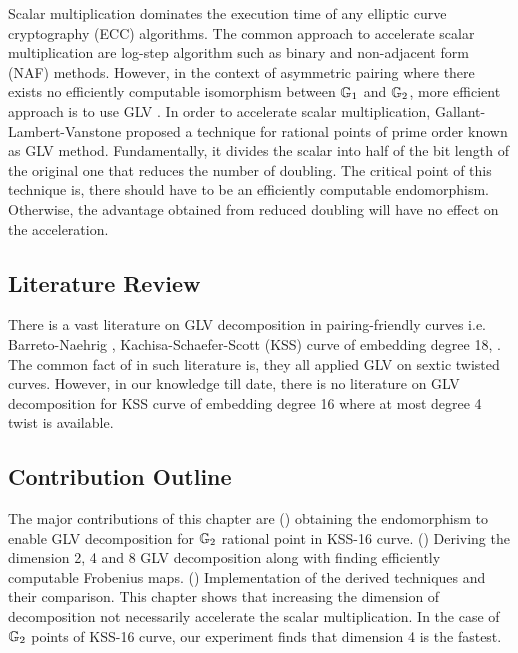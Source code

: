 Scalar multiplication dominates the execution time of any elliptic curve cryptography (ECC) algorithms.
The common approach to accelerate scalar multiplication are log-step algorithm such as binary and non-adjacent form (NAF) methods.
However, in the context of asymmetric pairing where there exists no efficiently computable isomorphism between ${\mathbb{G}}_{1}$ and ${\mathbb{G}}_{2}$, more efficient approach is to use GLV \cite{CANS:SNOKM08, khandaker2017improvement}.
In order to accelerate scalar multiplication, Gallant-Lambert-Vanstone \cite{C:GalLamVan01} proposed a technique for rational points of prime order known as GLV method.
Fundamentally, it divides the scalar into half of the bit length of the original one that reduces the number of doubling.
The critical point of this technique is, there should have to be an efficiently computable endomorphism. 
Otherwise, the advantage obtained from reduced doubling will have no effect on the acceleration. 

\subsection{Literature Review}
There is a vast literature on GLV decomposition in pairing-friendly curves i.e.  Barreto-Naehrig \cite{SAC:BarNae05}, Kachisa-Schaefer-Scott (KSS) curve of embedding degree 18,  \cite{CANS:SNOKM08, khandaker2017improvement, DBLP:journals/ieicet/NogamiSONAM09, faz2015efficient, JC:GalLinSco11}. 
The common fact of in such literature is, they all applied GLV on sextic twisted curves. 
However, in our knowledge till date, there is no literature on GLV decomposition for  KSS curve of embedding degree 16 where at most degree 4 twist is available.

\subsection{Contribution Outline}
The major contributions of this chapter are () obtaining the endomorphism to enable GLV decomposition for ${\mathbb{G}}_{2}$ rational point in KSS-16 curve. 
() Deriving the dimension 2, 4 and 8 GLV decomposition along with finding efficiently computable Frobenius maps. () Implementation of the derived techniques and their comparison. 
This chapter shows that increasing the dimension of decomposition not necessarily accelerate the scalar multiplication. 
In the case of ${\mathbb{G}}_{2}$ points of KSS-16 curve, our experiment finds that dimension 4 is the fastest. 


